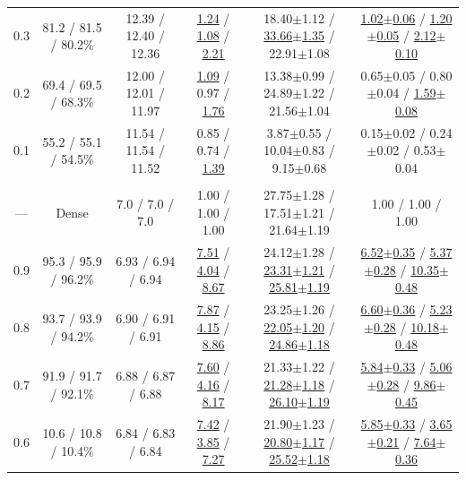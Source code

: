 \begin{table}[!t]
\begin{tabular}{cccccc}
0.3 & 81.2 / 81.5 / 80.2\% & 12.39 / 12.40 / 12.36 & \underline{1.24} / \underline{1.08} / \underline{2.21} & 18.40{\scriptsize$\pm$1.12} / \underline{33.66{\scriptsize$\pm$1.35}} / 22.91{\scriptsize$\pm$1.08} & \underline{1.02{\scriptsize$\pm$0.06}} / \underline{1.20{\scriptsize$\pm$0.05}} / \underline{2.12{\scriptsize$\pm$0.10}} \\
0.2 & 69.4 / 69.5 / 68.3\% & 12.00 / 12.01 / 11.97 & \underline{1.09} / 0.97 / \underline{1.76} & 13.38{\scriptsize$\pm$0.99} / 24.89{\scriptsize$\pm$1.22} / 21.56{\scriptsize$\pm$1.04} & 0.65{\scriptsize$\pm$0.05} / 0.80{\scriptsize$\pm$0.04} / \underline{1.59{\scriptsize$\pm$0.08}} \\
0.1 & 55.2 / 55.1 / 54.5\% & 11.54 / 11.54 / 11.52 & 0.85 / 0.74 / \underline{1.39} & 3.87{\scriptsize$\pm$0.55} / 10.04{\scriptsize$\pm$0.83} / 9.15{\scriptsize$\pm$0.68} & 0.15{\scriptsize$\pm$0.02} / 0.24{\scriptsize$\pm$0.02} / 0.53{\scriptsize$\pm$0.04} \\
\addlinespace[0.5pt]
\rowcolor{lightgray} \multicolumn{6}{c}{\rule{0pt}{2.2ex}\textbf{Qwen2.5-7B}\rule[-0.8ex]{0pt}{0pt}} \\
--- & Dense & 7.0 / 7.0 / 7.0 & 1.00 / 1.00 / 1.00 & 27.75{\scriptsize$\pm$1.28} / 17.51{\scriptsize$\pm$1.21} / 21.64{\scriptsize$\pm$1.19} & 1.00 / 1.00 / 1.00 \\
0.9 & 95.3 / 95.9 / 96.2\% & 6.93 / 6.94 / 6.94 & \underline{7.51} / \underline{4.04} / \underline{8.67} & 24.12{\scriptsize$\pm$1.28} / \underline{23.31{\scriptsize$\pm$1.21}} / \underline{25.81{\scriptsize$\pm$1.19}} & \underline{6.52{\scriptsize$\pm$0.35}} / \underline{5.37{\scriptsize$\pm$0.28}} / \underline{10.35{\scriptsize$\pm$0.48}} \\
0.8 & 93.7 / 93.9 / 94.2\% & 6.90 / 6.91 / 6.91 & \underline{7.87} / \underline{4.15} / \underline{8.86} & 23.25{\scriptsize$\pm$1.26} / \underline{22.05{\scriptsize$\pm$1.20}} / \underline{24.86{\scriptsize$\pm$1.18}} & \underline{6.60{\scriptsize$\pm$0.36}} / \underline{5.23{\scriptsize$\pm$0.28}} / \underline{10.18{\scriptsize$\pm$0.48}} \\
0.7 & 91.9 / 91.7 / 92.1\% & 6.88 / 6.87 / 6.88 & \underline{7.60} / \underline{4.16} / \underline{8.17} & 21.33{\scriptsize$\pm$1.22} / \underline{21.28{\scriptsize$\pm$1.18}} / \underline{26.10{\scriptsize$\pm$1.19}} & \underline{5.84{\scriptsize$\pm$0.33}} / \underline{5.06{\scriptsize$\pm$0.28}} / \underline{9.86{\scriptsize$\pm$0.45}} \\
0.6 & 10.6 / 10.8 / 10.4\% & 6.84 / 6.83 / 6.84 & \underline{7.42} / \underline{3.85} / \underline{7.27} & 21.90{\scriptsize$\pm$1.23} / \underline{20.80{\scriptsize$\pm$1.17}} / \underline{25.52{\scriptsize$\pm$1.18}} & \underline{5.85{\scriptsize$\pm$0.33}} / \underline{3.65{\scriptsize$\pm$0.21}} / \underline{7.64{\scriptsize$\pm$0.36}} \\

\end{tabular}
\end{table}
